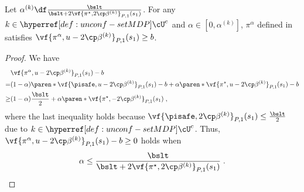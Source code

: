 \begin{lemma}\label{lemma:mixture-feasibility}
Let $\alpha^{(k)} \df \frac{\bslt}{\bslt + 2 \vf{\pi^\star, 2\cp \beta^{(k)}}_{P, 1}(s_1)}$.
For any $k \in \unconfMDP^c$ and $\alpha \in [0, \alpha^{(k)}]$, $\pi^\alpha$ defined in  satisfies
\(
\vf{\pi^\alpha, u-2\cp \beta^{(k)}}_{P, 1}(s_1) \geq b
\).
\end{lemma}
\begin{proof}
We have    
\begin{align*}
&\vf{\pi^\alpha, u-2\cp \beta^{(k)}}_{P, 1}(s_1) - b\\
=& 
(1-\alpha)\paren*{\vf{\pisafe, u-2\cp \beta^{(k)}}_{P, 1}(s_1) - b}
+ \alpha\paren*{\vf{\pi^\star, u-2\cp \beta^{(k)}}_{P, 1}(s_1) - b}\\
\geq&
(1-\alpha)\frac{\bslt}{2}
+ \alpha\paren*{\vf{\pi^\star, -2\cp \beta^{(k)}}_{P, 1}(s_1)}\;,
\end{align*}
where the last inequality holds because $\vf{\pisafe, 2\cp\beta^{(k)}}_{P, 1}(s_1) \leq \frac{\bslt}{2}$ due to $k \in \unconfMDP^c$.
Thus, $\vf{\pi^\alpha, u-2\cp \beta^{(k)}}_{P, 1}(s_1) - b \geq 0$ holds when 
\begin{align*}
\alpha \leq \frac{\bslt}{\bslt + 2 \vf{\pi^\star, 2\cp \beta^{(k)}}_{P, 1}(s_1)}\;.
\end{align*}
\end{proof}


